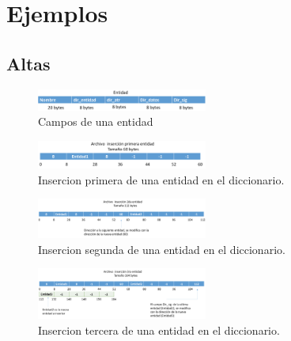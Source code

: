 \section{Ejemplos}

\subsection{Altas}
\begin{figure}[!ht]
\begin{center}
  \includegraphics[width=0.5\textwidth]{secciones/ejemploA/img1.png}
  \caption{Campos de una entidad}
\end{center}
\end{figure}
\begin{figure}[!ht]
\begin{center}
  \includegraphics[width=0.5\textwidth]{secciones/ejemploA/img2.png}
  \caption{Insercion primera de una entidad en el diccionario.}
\end{center}
\end{figure}
\begin{figure}[!ht]
\begin{center}
  \includegraphics[width=0.5\textwidth]{secciones/ejemploA/img3.png}
  \caption{Insercion segunda de una entidad en el diccionario.}
\end{center}
\end{figure}
\begin{figure}[!ht]
\begin{center}
  \includegraphics[width=0.5\textwidth]{secciones/ejemploA/img4.png}
  \caption{Insercion tercera de una entidad en el diccionario.}
\end{center}
\end{figure}

